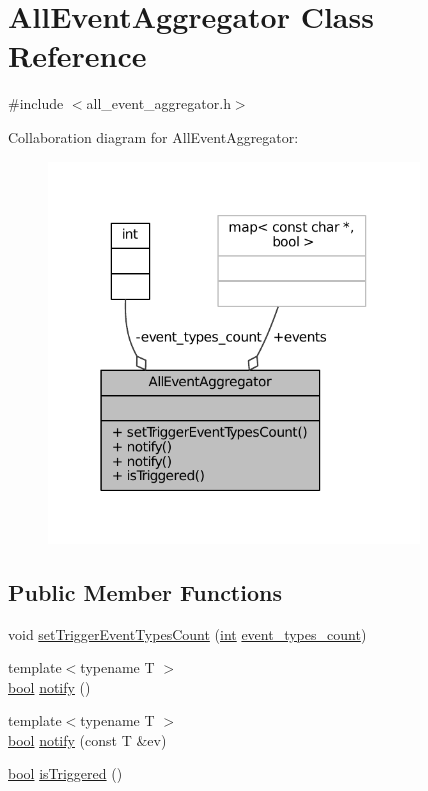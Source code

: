 \hypertarget{classAllEventAggregator}{}\section{All\+Event\+Aggregator Class Reference}
\label{classAllEventAggregator}


{\ttfamily \#include $<$all\+\_\+event\+\_\+aggregator.\+h$>$}



Collaboration diagram for All\+Event\+Aggregator\+:
\nopagebreak
\begin{figure}[H]
\begin{center}
\leavevmode
\includegraphics[width=279pt]{classAllEventAggregator__coll__graph}
\end{center}
\end{figure}
\subsection*{Public Member Functions}
\begin{DoxyCompactItemize}
\item 
void \hyperlink{classAllEventAggregator_ab9d6e59d70fd564ffa2333a30c9a41de}{set\+Trigger\+Event\+Types\+Count} (\hyperlink{classint}{int} \hyperlink{classAllEventAggregator_a8b64cd4c8d8592916a19c628b61606cd}{event\+\_\+types\+\_\+count})
\item 
{\footnotesize template$<$typename T $>$ }\\\hyperlink{classbool}{bool} \hyperlink{classAllEventAggregator_aec3ce484f803c39cb1fddefb07611e45}{notify} ()
\item 
{\footnotesize template$<$typename T $>$ }\\\hyperlink{classbool}{bool} \hyperlink{classAllEventAggregator_a2480186f62c0f2809f9683bb42e8bbb6}{notify} (const T \&ev)
\item 
\hyperlink{classbool}{bool} \hyperlink{classAllEventAggregator_a043a05c1b9b4fe79aa4513cb37414f9a}{is\+Triggered} ()
\end{DoxyCompactItemize}
